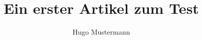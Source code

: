 \documentclass{dtk2}
\author{Hugo Mustermann}
\begin{document}
\title{Ein erster Artikel zum Test}

\maketitle

\blinddocument

%
\end{document}
